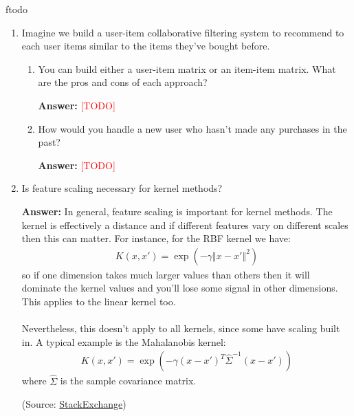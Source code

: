 ƒtodo\documentclass{article}
\newenvironment{QandA}{\begin{enumerate}[label=\arabic*.]}{\end{enumerate}}
\newenvironment{InnerQandA}{\begin{enumerate}[label=\roman*.]}{\end{enumerate}}
\newenvironment{answer}{\par\normalfont \textbf{Answer:}}{}
\newcommand{\todo}{\textcolor{red}{[TODO]}}
\begin{document}
\begin{QandA}
    \item Imagine we build a user-item collaborative filtering system to recommend to each user items similar to the items they’ve bought before.
    \begin{InnerQandA}
        \item You can build either a user-item matrix or an item-item matrix. What are the pros and cons of each approach?
        \begin{answer}
            \todo 
        \end{answer}

        \item How would you handle a new user who hasn’t made any purchases in the past?
        \begin{answer}
            \todo
        \end{answer}
    \end{InnerQandA}

    \item Is feature scaling necessary for kernel methods?
    \begin{answer}
        In general, feature scaling is important for kernel methods. The kernel is effectively a distance and if different features vary on different scales then this can matter. For instance, for the RBF kernel we have:
        \begin{align*}
            K(x, x') = \exp \left(-\gamma \left\Vert x - x'\right\Vert^2 \right)
        \end{align*}
        so if one dimension takes much larger values than others then it will dominate the kernel values and you'll lose some signal in other dimensions. This applies to the linear kernel too. \\\\
        Nevertheless, this doesn't apply to all kernels, since some have scaling built in. A typical example is the Mahalanobis kernel:
        \begin{align*}
            K(x, x') = \exp \left(-\gamma (x - x')^T\hat{\Sigma}^{-1}(x-x') \right)
        \end{align*}
        where $\hat{\Sigma}$ is the sample covariance matrix.

        (Source: \href{https://stats.stackexchange.com/questions/305906/feature-scaling-in-svm-does-it-depend-on-the-kernel}{StackExchange})
    \end{answer}


\end{QandA}
\end{document}
